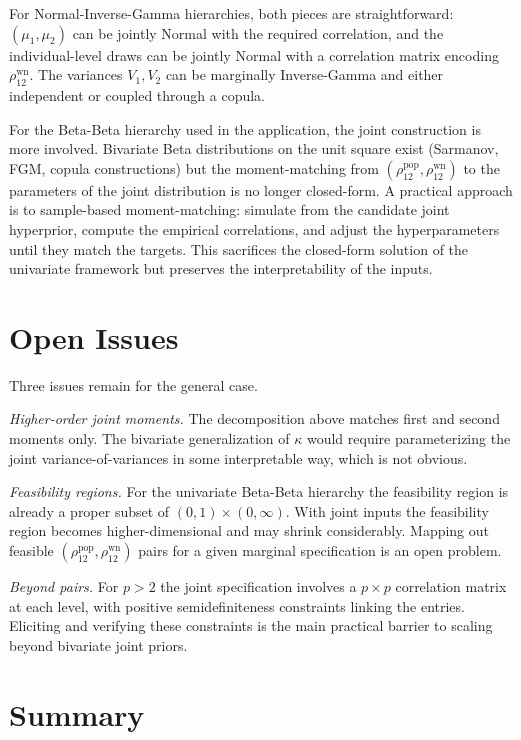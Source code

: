 \documentclass[11pt,a4paper]{article}
\theoremstyle{definition}
\begin{document}
For Normal-Inverse-Gamma hierarchies, both pieces are straightforward:
$(\mu_1, \mu_2)$ can be jointly Normal with the required correlation,
and the individual-level draws can be jointly Normal with a correlation
matrix encoding $\rho^{\text{wn}}_{12}$. The variances $V_1, V_2$ can
be marginally Inverse-Gamma and either independent or coupled through a
copula.

For the Beta-Beta hierarchy used in the application, the joint
construction is more involved. Bivariate Beta distributions on the
unit square exist (Sarmanov, FGM, copula constructions) but the
moment-matching from $(\rho^{\text{pop}}_{12}, \rho^{\text{wn}}_{12})$
to the parameters of the joint distribution is no longer closed-form.
A practical approach is to sample-based moment-matching: simulate from
the candidate joint hyperprior, compute the empirical correlations, and
adjust the hyperparameters until they match the targets. This
sacrifices the closed-form solution of the univariate framework but
preserves the interpretability of the inputs.

\section{Open Issues}

Three issues remain for the general case.

\textit{Higher-order joint moments.} The decomposition above matches
first and second moments only. The bivariate generalization of $\kappa$
would require parameterizing the joint variance-of-variances in some
interpretable way, which is not obvious.

\textit{Feasibility regions.} For the univariate Beta-Beta hierarchy
the feasibility region is already a proper subset of $(0,1) \times
(0,\infty)$. With joint inputs the feasibility region becomes
higher-dimensional and may shrink considerably. Mapping out feasible
$(\rho^{\text{pop}}_{12}, \rho^{\text{wn}}_{12})$ pairs for a given
marginal specification is an open problem.

\textit{Beyond pairs.} For $p > 2$ the joint specification involves a
$p \times p$ correlation matrix at each level, with positive
semidefiniteness constraints linking the entries. Eliciting and
verifying these constraints is the main practical barrier to scaling
beyond bivariate joint priors.

\section{Summary}
\end{document}
